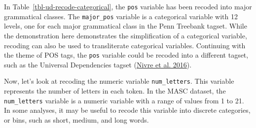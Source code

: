 \documentclass[
  letterpaper,
  DIV=11,
  numbers=noendperiod]{scrreport}
\theoremstyle{definition}
\theoremstyle{remark}
\begin{document}
In Table~\ref{tbl-ud-recode-categorical}, the \texttt{pos} variable has
been recoded into major grammatical classes. The \texttt{major\_pos}
variable is a categorical variable with 12 levels, one for each major
grammatical class in the Penn Treebank tagset. While the demonstration
here demonstrates the simplification of a categorical variable, recoding
can also be used to transliterate categorical variables. Continuing with
the theme of POS tags, the \texttt{pos} variable could be recoded into a
different tagset, such as the Universal Dependencies tagset
(\protect\hyperlink{ref-Nivre2016}{Nivre et al. 2016}).

Now, let's look at recoding the numeric variable \texttt{num\_letters}.
This variable represents the number of letters in each token. In the
MASC dataset, the \texttt{num\_letters} variable is a numeric variable
with a range of values from 1 to 21. In some analyses, it may be useful
to recode this variable into discrete categories, or bins, such as
short, medium, and long words.
\end{document}
